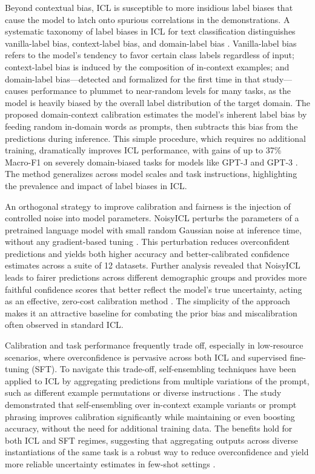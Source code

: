 \documentclass[11pt]{article}
\begin{document}
Beyond contextual bias, ICL is susceptible to more insidious label biases that cause the model to latch onto spurious correlations in the demonstrations. A systematic taxonomy of label biases in ICL for text classification distinguishes vanilla-label bias, context-label bias, and domain-label bias \cite{ref90}. Vanilla-label bias refers to the model's tendency to favor certain class labels regardless of input; context-label bias is induced by the composition of in-context examples; and domain-label bias---detected and formalized for the first time in that study---causes performance to plummet to near-random levels for many tasks, as the model is heavily biased by the overall label distribution of the target domain. The proposed domain-context calibration estimates the model's inherent label bias by feeding random in-domain words as prompts, then subtracts this bias from the predictions during inference. This simple procedure, which requires no additional training, dramatically improves ICL performance, with gains of up to 37\% Macro-F1 on severely domain-biased tasks for models like GPT-J and GPT-3 \cite{ref90}. The method generalizes across model scales and task instructions, highlighting the prevalence and impact of label biases in ICL.

An orthogonal strategy to improve calibration and fairness is the injection of controlled noise into model parameters. NoisyICL perturbs the parameters of a pretrained language model with small random Gaussian noise at inference time, without any gradient-based tuning \cite{ref91}. This perturbation reduces overconfident predictions and yields both higher accuracy and better-calibrated confidence estimates across a suite of 12 datasets. Further analysis revealed that NoisyICL leads to fairer predictions across different demographic groups and provides more faithful confidence scores that better reflect the model's true uncertainty, acting as an effective, zero-cost calibration method \cite{ref91}. The simplicity of the approach makes it an attractive baseline for combating the prior bias and miscalibration often observed in standard ICL.

Calibration and task performance frequently trade off, especially in low-resource scenarios, where overconfidence is pervasive across both ICL and supervised fine-tuning (SFT). To navigate this trade-off, self-ensembling techniques have been applied to ICL by aggregating predictions from multiple variations of the prompt, such as different example permutations or diverse instructions \cite{ref92}. The study demonstrated that self-ensembling over in-context example variants or prompt phrasing improves calibration significantly while maintaining or even boosting accuracy, without the need for additional training data. The benefits hold for both ICL and SFT regimes, suggesting that aggregating outputs across diverse instantiations of the same task is a robust way to reduce overconfidence and yield more reliable uncertainty estimates in few-shot settings \cite{ref92}.
\end{document}
